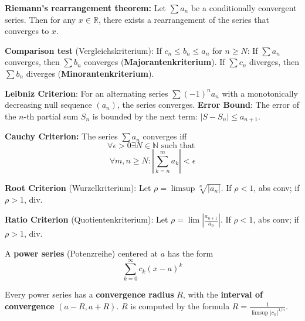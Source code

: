 \begin{theorem}
    \textbf{Riemann's rearrangement theorem:}
    Let $\sum a_n$ be a conditionally convergent series. Then for any $x \in \mathbb{R}$, there exists a rearrangement of the series that converges to $x$.
\end{theorem}

\begin{theorem}
    \textbf{Comparison test} (Vergleichskriterium): If $c_n \le b_n \le a_n$ for $n \ge N$:
    If $\sum a_n$ converges, then $\sum b_n$ converges (\textbf{Majorantenkriterium}).
    If $\sum c_n$ diverges, then $\sum b_n$ diverges (\textbf{Minorantenkriterium}).
\end{theorem}

\begin{theorem}
    \textbf{Leibniz Criterion}: For an alternating series $\sum (-1)^n a_n$ with a monotonically decreasing null sequence $(a_n)$, the series converges.
    \textbf{Error Bound}: The error of the $n$-th partial sum $S_n$ is bounded by the next term: $|S - S_n| \le a_{n+1}$.
\end{theorem}

\begin{theorem}
    \textbf{Cauchy Criterion:} The series $\sum a_n$ converges iff 
    $$\forall \epsilon \gt 0 \exists N \in \mathbb{N} \text{ such that }$$
    $$\forall m, n \ge N : |\sum_{k=n}^m a_k| \lt \epsilon$$
\end{theorem}

\begin{theorem}
    \textbf{Root Criterion} (Wurzelkriterium): Let $\rho = \limsup \sqrt[n]{|a_n|}$. If $\rho \lt 1$, abs conv; if $\rho \gt 1$, div.
\end{theorem}

\begin{theorem}
    \textbf{Ratio Criterion} (Quotientenkriterium): Let $\rho = \lim \left| \frac{a_{n+1}}{a_n} \right|$. If $\rho \lt 1$, abs conv; if $\rho \gt 1$, div.
\end{theorem}

\begin{definition}
    A \textbf{power series} (Potenzreihe) centered at $a$ has the form 
    $$\sum_{k=0}^\infty c_k(x-a)^k$$
\end{definition}

\begin{theorem}
    Every power series has a \textbf{convergence radius} $R$, with the \textbf{interval of convergence} $(a-R, a+R)$. $R$ is computed by the formula $R = \frac{1}{\limsup |c_n|^{1/n}}$.
\end{theorem}


